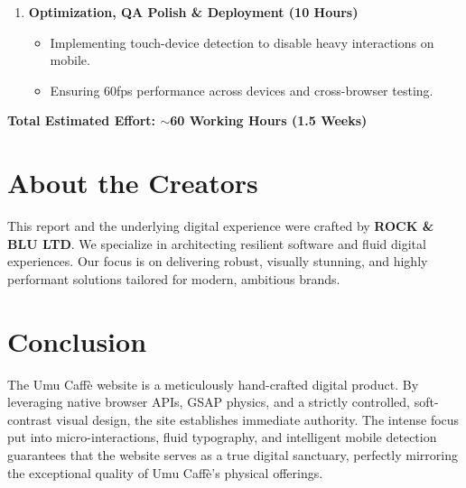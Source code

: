\documentclass[11pt, a4paper]{article}
\begin{document}
\begin{enumerate}[label=\textcolor{umuaccent}{\textbf{\arabic*.}}]
    \item \textbf{Optimization, QA Polish \& Deployment (10 Hours)}
    \begin{itemize}[label=\textcolor{umufg}{\textbullet}]
        \item Implementing touch-device detection to disable heavy interactions on mobile.
        \item Ensuring 60fps performance across devices and cross-browser testing.
    \end{itemize}
\end{enumerate}

\vspace{0.5cm}
\textbf{Total Estimated Effort: $\sim$60 Working Hours (1.5 Weeks)}

\section{About the Creators}
This report and the underlying digital experience were crafted by \textbf{ROCK \& BLU LTD}. We specialize in architecting resilient software and fluid digital experiences. Our focus is on delivering robust, visually stunning, and highly performant solutions tailored for modern, ambitious brands.

\section{Conclusion}
The Umu Caffè website is a meticulously hand-crafted digital product. By leveraging native browser APIs, GSAP physics, and a strictly controlled, soft-contrast visual design, the site establishes immediate authority. The intense focus put into micro-interactions, fluid typography, and intelligent mobile detection guarantees that the website serves as a true digital sanctuary, perfectly mirroring the exceptional quality of Umu Caffè's physical offerings.
\end{document}
